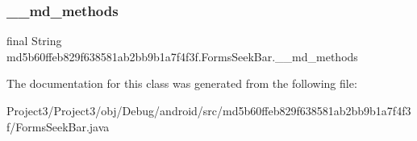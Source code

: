 \subsubsection{\texorpdfstring{\+\_\+\+\_\+md\+\_\+methods}{\_\_md\_methods}}
{\footnotesize\ttfamily final String md5b60ffeb829f638581ab2bb9b1a7f4f3f.\+Forms\+Seek\+Bar.\+\_\+\+\_\+md\+\_\+methods\hspace{0.3cm}{\ttfamily [static]}}



The documentation for this class was generated from the following file\+:\begin{DoxyCompactItemize}
\item 
Project3/\+Project3/obj/\+Debug/android/src/md5b60ffeb829f638581ab2bb9b1a7f4f3f/Forms\+Seek\+Bar.\+java\end{DoxyCompactItemize}
